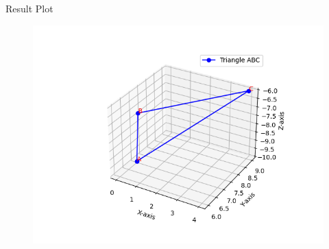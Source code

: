 \documentclass{beamer}
\numberwithin{equation}{section}
\theoremstyle{remark}
\begin{document}
\begin{frame}{Result Plot}
 \begin{figure}[H]
     \centering
     \includegraphics[width=0.8\columnwidth]{figs/fig1.png}
     \caption*{}
     \label{fig:fig1}
 \end{figure}
  
\end{frame}
\end{document}
